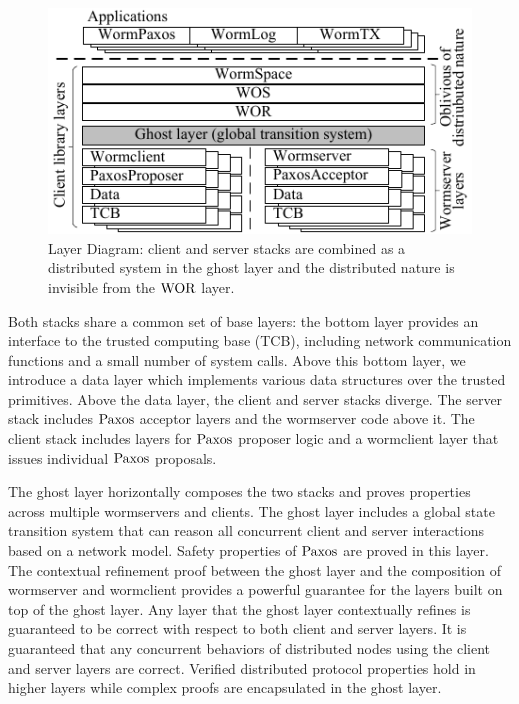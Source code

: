 \begin{figure}
\centering
\includegraphics{figs/multipaxos/layer_diagram.pdf}
\caption{Layer Diagram: client and server stacks are combined as a distributed system in the ghost layer and the distributed nature is invisible from the $\mathrm{WOR}$ layer.}
\label{fig:layerdiagram}
\end{figure}


Both stacks share a common set of base layers: 
the bottom layer provides an interface to the trusted computing base (TCB), 
including network communication functions and a small number of system calls. Above this bottom layer, 
we introduce a data layer which implements various data structures over the trusted primitives. 
Above the data layer, the client and server stacks diverge. 
The server stack includes $\mathrm{Paxos}$ acceptor layers and the wormserver code above it.
The client stack includes layers for $\mathrm{Paxos}$ proposer logic and a wormclient layer that issues individual $\mathrm{Paxos}$ proposals.

The ghost layer horizontally composes the two stacks and proves properties across multiple wormservers and clients.
The ghost layer includes a global state transition system that can reason all concurrent client and server interactions based on a network model. 
Safety properties of $\mathrm{Paxos}$ are proved in this layer.
The contextual refinement proof between the ghost layer and the composition of wormserver and wormclient provides a powerful guarantee 
for  the layers built on top of the ghost layer. 
Any layer that the ghost layer contextually refines is guaranteed to be correct with respect to both client and server layers. 
It is guaranteed that any concurrent behaviors of distributed nodes using the client and server layers are correct. 
Verified distributed protocol properties hold in higher layers while complex proofs are encapsulated in the ghost layer.

